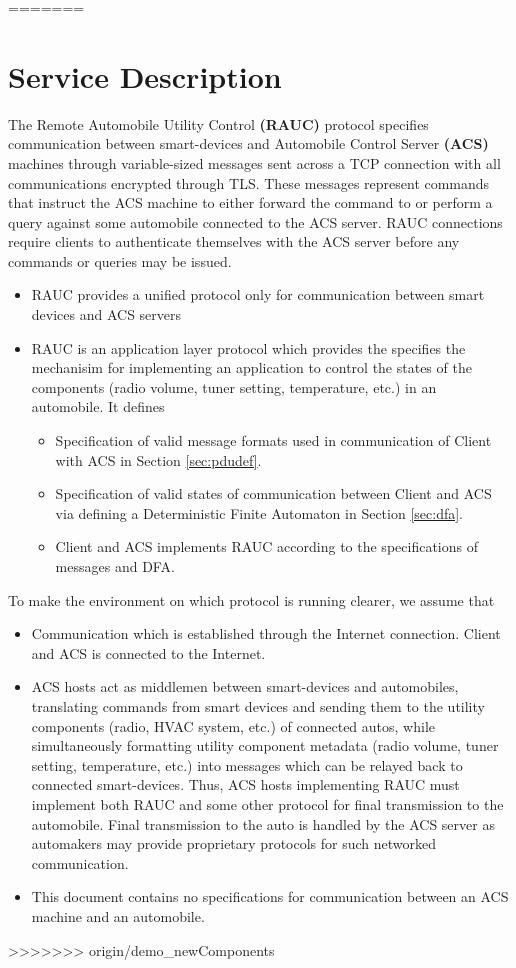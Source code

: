 =======

\section{Service Description}
\label{sec:serv_desc}

The Remote Automobile Utility Control \textbf{(RAUC)} protocol specifies communication between smart-devices and Automobile Control Server \textbf{(ACS)} machines through variable-sized messages sent across a TCP connection with all communications encrypted through TLS. These messages represent commands that instruct the ACS machine to either forward the command to or perform a query against some automobile connected to the ACS server. RAUC connections require clients to authenticate themselves with the ACS server before any commands or queries may be issued.
\begin{itemize}
\item  RAUC provides a unified protocol only for communication between smart devices and ACS servers
\item RAUC is  an application layer protocol which provides the specifies the mechanisim for implementing an application to control the states of the components (radio volume, tuner setting, temperature, etc.) in an automobile. It defines 
\begin{itemize}
\item Specification of valid message formats used in communication of Client with ACS in Section \ref{sec:pdudef}.
\item Specification of valid states of communication between Client and ACS via defining a Deterministic Finite Automaton in Section \ref{sec:dfa}. 
\item Client and ACS implements RAUC according to the specifications of messages and DFA.
\end{itemize}
\end{itemize}

To make the environment on which protocol is running clearer, we assume that 
\begin{itemize}
\item Communication which is established through the Internet connection. Client and ACS is connected to the Internet.
\item ACS hosts act as middlemen between smart-devices and automobiles, translating commands from smart devices and sending them to the utility components (radio, HVAC system, etc.) of connected autos, while simultaneously formatting utility component metadata (radio volume, tuner setting, temperature, etc.) into messages which can be relayed back to connected smart-devices.  Thus, ACS hosts implementing RAUC must implement both RAUC and some other protocol for final transmission to the automobile. Final transmission to the auto is handled by the ACS server as automakers may provide proprietary protocols for such networked communication. 
\item This document contains no specifications for communication between an ACS machine and an automobile.
\end{itemize}


>>>>>>> origin/demo_newComponents
